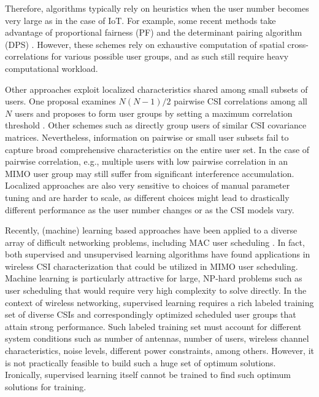 Therefore, algorithms typically rely on heuristics when the user number becomes very large as in the case of IoT. 
For example, some recent methods take advantage of proportional fairness (PF) and the determinant pairing algorithm (DPS) \cite{Chen08, Chang16, wang11}. 
However, these schemes rely on exhaustive computation of spatial cross-correlations for various possible user groups, and as such still require heavy computational workload.

Other approaches exploit localized characteristics shared among small subsets of users. One proposal examines $N(N-1)/2$ pairwise CSI correlations among all $N$ users and proposes to form user groups by setting a maximum correlation threshold \cite{Zhang05, Kim15}. 
Other schemes such as \cite{Dhanushka19, Sharath19} directly group users of similar CSI covariance matrices.  
Nevertheless, information on pairwise or small user subsets fail to capture broad comprehensive characteristics on the entire user set. 
In the case of pairwise correlation, e.g., multiple users with low pairwise correlation in an MIMO user group may still suffer from significant interference accumulation. 
Localized approaches are also very sensitive to choices of manual parameter tuning and are harder to scale, as different choices might lead to drastically different performance as the user number changes or as the CSI models vary. 

Recently, (machine) learning based approaches have been applied to a diverse array of difficult networking problems, including MAC user scheduling \cite{Jiang17, Morocho19, Xu14, Cui18}. 
In fact, both supervised and unsupervised learning algorithms have found applications in wireless CSI characterization \cite{Jiang17} that could be utilized in MIMO user scheduling.
Machine learning is particularly attractive for large, NP-hard problems such as user scheduling that would require very high complexity to solve directly.
In the context of wireless networking, supervised learning requires a rich labeled training set of diverse CSIs and correspondingly optimized scheduled user groups that attain strong performance. 
Such labeled training set must account for different system conditions such as number of antennas, number of users, wireless channel characteristics, noise levels, different power constraints, among others.
However, it is not practically feasible to build such a huge set of optimum solutions. 
Ironically, supervised learning itself cannot be trained to find such optimum solutions for training.

